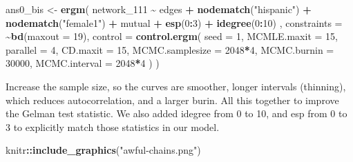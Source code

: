 \documentclass[
]{book}
\newenvironment{Shaded}{\begin{snugshade}}{\end{snugshade}}
\newcommand{\AttributeTok}[1]{\textcolor[rgb]{0.13,0.29,0.53}{#1}}
\newcommand{\DecValTok}[1]{\textcolor[rgb]{0.00,0.00,0.81}{#1}}
\newcommand{\FunctionTok}[1]{\textcolor[rgb]{0.13,0.29,0.53}{\textbf{#1}}}
\newcommand{\NormalTok}[1]{#1}
\newcommand{\OtherTok}[1]{\textcolor[rgb]{0.56,0.35,0.01}{#1}}
\newcommand{\SpecialCharTok}[1]{\textcolor[rgb]{0.81,0.36,0.00}{\textbf{#1}}}
\newcommand{\StringTok}[1]{\textcolor[rgb]{0.31,0.60,0.02}{#1}}
\begin{document}
\begin{Shaded}
\begin{Highlighting}[]
\NormalTok{ans0\_bis }\OtherTok{\textless{}{-}} \FunctionTok{ergm}\NormalTok{(}
\NormalTok{  network\_111 }\SpecialCharTok{\textasciitilde{}}
\NormalTok{    edges }\SpecialCharTok{+}
    \FunctionTok{nodematch}\NormalTok{(}\StringTok{"hispanic"}\NormalTok{) }\SpecialCharTok{+}
    \FunctionTok{nodematch}\NormalTok{(}\StringTok{"female1"}\NormalTok{) }\SpecialCharTok{+}
\NormalTok{    mutual }\SpecialCharTok{+} 
    \FunctionTok{esp}\NormalTok{(}\DecValTok{0}\SpecialCharTok{:}\DecValTok{3}\NormalTok{) }\SpecialCharTok{+} 
    \FunctionTok{idegree}\NormalTok{(}\DecValTok{0}\SpecialCharTok{:}\DecValTok{10}\NormalTok{)}
\NormalTok{    ,}
  \AttributeTok{constraints =} \SpecialCharTok{\textasciitilde{}}\FunctionTok{bd}\NormalTok{(}\AttributeTok{maxout =} \DecValTok{19}\NormalTok{),}
  \AttributeTok{control =} \FunctionTok{control.ergm}\NormalTok{(}
    \AttributeTok{seed        =} \DecValTok{1}\NormalTok{,}
    \AttributeTok{MCMLE.maxit =} \DecValTok{15}\NormalTok{,}
    \AttributeTok{parallel    =} \DecValTok{4}\NormalTok{,}
    \AttributeTok{CD.maxit    =} \DecValTok{15}\NormalTok{,}
    \AttributeTok{MCMC.samplesize =} \DecValTok{2048}\SpecialCharTok{*}\DecValTok{4}\NormalTok{,}
    \AttributeTok{MCMC.burnin =} \DecValTok{30000}\NormalTok{,}
    \AttributeTok{MCMC.interval =} \DecValTok{2048}\SpecialCharTok{*}\DecValTok{4}
\NormalTok{    )}
\NormalTok{  )}
\end{Highlighting}
\end{Shaded}

Increase the sample size, so the curves are smoother, longer intervals (thinning), which reduces autocorrelation, and a larger burin. All this together to improve the Gelman test statistic. We also added idegree from 0 to 10, and esp from 0 to 3 to explicitly match those statistics in our model.

\begin{Shaded}
\begin{Highlighting}[]
\NormalTok{knitr}\SpecialCharTok{::}\FunctionTok{include\_graphics}\NormalTok{(}\StringTok{"awful{-}chains.png"}\NormalTok{)}
\end{Highlighting}
\end{Shaded}
\end{document}
